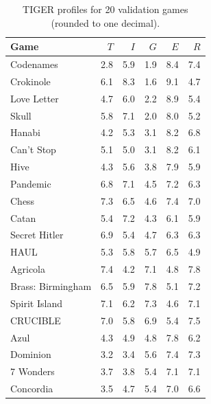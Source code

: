 \begin{table}[h]
\centering
\caption{TIGER profiles for 20 validation games (rounded to one decimal).}
\label{tab:full-profiles}
\begin{tabular}{lrrrrr}
\hline
\textbf{Game} & $T$ & $I$ & $G$ & $E$ & $R$ \\
\hline
Codenames       & 2.8 & 5.9 & 1.9 & 8.4 & 7.4 \\
Crokinole       & 6.1 & 8.3 & 1.6 & 9.1 & 4.7 \\
Love Letter     & 4.7 & 6.0 & 2.2 & 8.9 & 5.4 \\
Skull           & 5.8 & 7.1 & 2.0 & 8.0 & 5.2 \\
Hanabi          & 4.2 & 5.3 & 3.1 & 8.2 & 6.8 \\
Can't Stop      & 5.1 & 5.0 & 3.1 & 8.2 & 6.1 \\
Hive            & 4.3 & 5.6 & 3.8 & 7.9 & 5.9 \\
Pandemic        & 6.8 & 7.1 & 4.5 & 7.2 & 6.3 \\
Chess           & 7.3 & 6.5 & 4.6 & 7.4 & 7.0 \\
Catan           & 5.4 & 7.2 & 4.3 & 6.1 & 5.9 \\
Secret Hitler   & 6.9 & 5.4 & 4.7 & 6.3 & 6.3 \\
HAUL            & 5.3 & 5.8 & 5.7 & 6.5 & 4.9 \\
Agricola        & 7.4 & 4.2 & 7.1 & 4.8 & 7.8 \\
Brass: Birmingham & 6.5 & 5.9 & 7.8 & 5.1 & 7.2 \\
Spirit Island   & 7.1 & 6.2 & 7.3 & 4.6 & 7.1 \\
CRUCIBLE        & 7.0 & 5.8 & 6.9 & 5.4 & 7.5 \\
Azul            & 4.3 & 4.9 & 4.8 & 7.8 & 6.2 \\
Dominion        & 3.2 & 3.4 & 5.6 & 7.4 & 7.3 \\
7 Wonders       & 3.7 & 3.8 & 5.4 & 7.1 & 7.1 \\
Concordia       & 3.5 & 4.7 & 5.4 & 7.0 & 6.6 \\
\hline
\end{tabular}
\end{table}

